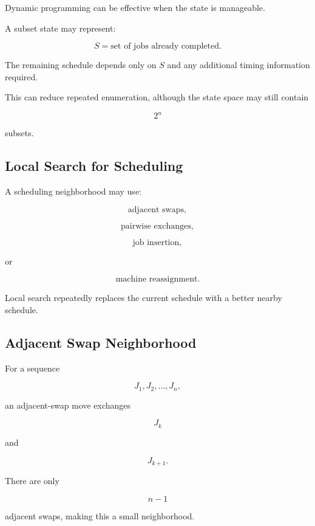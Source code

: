 Dynamic programming can be effective when the state is manageable.

A subset state may represent:

\[
\boxed{
S
=
\text{set of jobs already completed}.
}
\]

The remaining schedule depends only on \(S\) and any additional timing
information required.

This can reduce repeated enumeration, although the state space may still
contain

\[
\boxed{
2^n
}
\]

subsets.

\subsection{Local Search for Scheduling}
\label{subsec:scheduling-local-search}

A scheduling neighborhood may use:

\[
\boxed{
\text{adjacent swaps},
}
\]

\[
\boxed{
\text{pairwise exchanges},
}
\]

\[
\boxed{
\text{job insertion},
}
\]

or

\[
\boxed{
\text{machine reassignment}.
}
\]

Local search repeatedly replaces the current schedule with a better nearby
schedule.

\subsection{Adjacent Swap Neighborhood}
\label{subsec:adjacent-swap-neighborhood}

For a sequence

\[
J_1,J_2,\ldots,J_n,
\]

an adjacent-swap move exchanges

\[
J_k
\]

and

\[
J_{k+1}.
\]

There are only

\[
\boxed{
n-1
}
\]

adjacent swaps, making this a small neighborhood.

